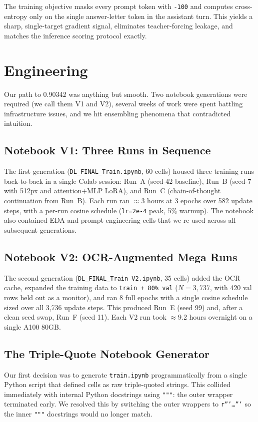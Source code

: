 \documentclass[11pt]{article}
\begin{document}
The training objective masks every prompt token with \texttt{-100} and computes cross-entropy only on the single answer-letter token in the assistant turn. This yields a sharp, single-target gradient signal, eliminates teacher-forcing leakage, and matches the inference scoring protocol exactly.

\section{Engineering}
\label{sec:engineering}

Our path to 0.90342 was anything but smooth. Two notebook generations were required (we call them V1 and V2), several weeks of work were spent battling infrastructure issues, and we hit ensembling phenomena that contradicted intuition.

\subsection{Notebook V1: Three Runs in Sequence}
The first generation (\texttt{DL\_FINAL\_Train.ipynb}, 60 cells) housed three training runs back-to-back in a single Colab session: Run~A (seed-42 baseline), Run~B (seed-7 with 512px and attention+MLP LoRA), and Run~C (chain-of-thought continuation from Run~B). Each run ran $\approx$3 hours at 3 epochs over 582 update steps, with a per-run cosine schedule (\texttt{lr=2e-4} peak, 5\% warmup). The notebook also contained EDA and prompt-engineering cells that we re-used across all subsequent generations.

\subsection{Notebook V2: OCR-Augmented Mega Runs}
The second generation (\texttt{DL\_FINAL\_Train V2.ipynb}, 35 cells) added the OCR cache, expanded the training data to \texttt{train + 80\% val} ($N{=}3{,}737$, with 420 val rows held out as a monitor), and ran 8 full epochs with a single cosine schedule sized over all 3{,}736 update steps. This produced Run~E (seed 99) and, after a clean seed swap, Run~F (seed 11). Each V2 run took $\approx$9.2 hours overnight on a single A100 80GB.

\subsection{The Triple-Quote Notebook Generator}
Our first decision was to generate \texttt{train.ipynb} programmatically from a single Python script that defined cells as raw triple-quoted strings. This collided immediately with internal Python docstrings using \texttt{"""}: the outer wrapper terminated early. We resolved this by switching the outer wrappers to \texttt{r'''\dots'''} so the inner \texttt{"""} docstrings would no longer match.
\end{document}
